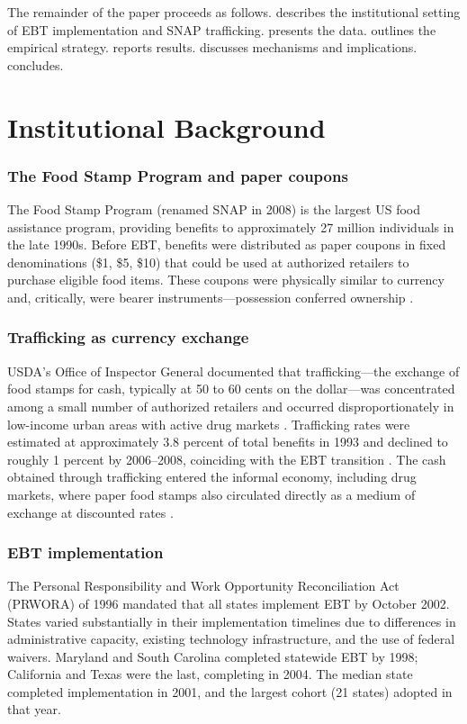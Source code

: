 \documentclass[12pt]{article}
\begin{document}
The remainder of the paper proceeds as follows.  describes the institutional setting of EBT implementation and SNAP trafficking.  presents the data.  outlines the empirical strategy.  reports results.  discusses mechanisms and implications.  concludes.

\section{Institutional Background}
\label{sec:background}

\subsubsection*{The Food Stamp Program and paper coupons} The Food Stamp Program (renamed SNAP in 2008) is the largest US food assistance program, providing benefits to approximately 27 million individuals in the late 1990s. Before EBT, benefits were distributed as paper coupons in fixed denominations (\$1, \$5, \$10) that could be used at authorized retailers to purchase eligible food items. These coupons were physically similar to currency and, critically, were bearer instruments---possession conferred ownership \citep{currie2008transfers}.

\subsubsection*{Trafficking as currency exchange} USDA's Office of Inspector General documented that trafficking---the exchange of food stamps for cash, typically at 50 to 60 cents on the dollar---was concentrated among a small number of authorized retailers and occurred disproportionately in low-income urban areas with active drug markets \citep{macaluso2003food}. Trafficking rates were estimated at approximately 3.8 percent of total benefits in 1993 and declined to roughly 1 percent by 2006--2008, coinciding with the EBT transition \citep{usda2013extent}. The cash obtained through trafficking entered the informal economy, including drug markets, where paper food stamps also circulated directly as a medium of exchange at discounted rates \citep{whitmore2002food}.

\subsubsection*{EBT implementation} The Personal Responsibility and Work Opportunity Reconciliation Act (PRWORA) of 1996 mandated that all states implement EBT by October 2002. States varied substantially in their implementation timelines due to differences in administrative capacity, existing technology infrastructure, and the use of federal waivers. Maryland and South Carolina completed statewide EBT by 1998; California and Texas were the last, completing in 2004. The median state completed implementation in 2001, and the largest cohort (21 states) adopted in that year.
\end{document}
